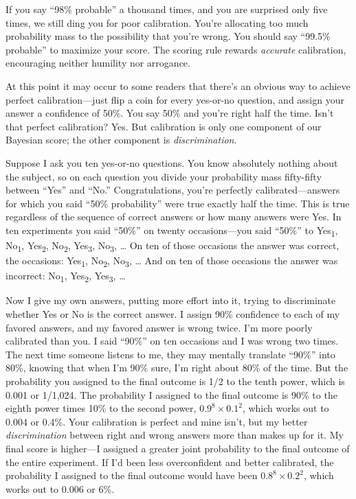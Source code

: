 {
 If you say ``98\% probable'' a
thousand times, and you are surprised only five times, we still ding
you for poor calibration. You're allocating too much
probability mass to the possibility that you're wrong.
You should say ``99.5\% probable''
to maximize your score. The scoring rule rewards \textit{accurate}
calibration, encouraging neither humility nor arrogance.}

{
 At this point it may occur to some readers that
there's an obvious way to achieve perfect
calibration---just flip a coin for every yes-or-no question, and assign
your answer a confidence of 50\%. You say 50\% and
you're right half the time. Isn't that
perfect calibration? Yes. But calibration is only one component of our
Bayesian score; the other component is \textit{discrimination}.}

{
 Suppose I ask you ten yes-or-no questions. You know absolutely
nothing about the subject, so on each question you divide your
probability mass fifty-fifty between
``Yes'' and
``No.'' Congratulations,
you're perfectly calibrated---answers for which you
said ``50\% probability'' were true
exactly half the time. This is true regardless of the sequence of
correct answers or how many answers were Yes. In ten experiments you
said ``50\%'' on twenty
occasions---you said ``50\%'' to
Yes\textsubscript{1}, No\textsubscript{1}, Yes\textsubscript{2},
No\textsubscript{2}, Yes\textsubscript{3}, No\textsubscript{3}, \ldots
On ten of those occasions the answer was correct, the occasions:
Yes\textsubscript{1}, No\textsubscript{2}, No\textsubscript{3}, \ldots
And on ten of those occasions the answer was incorrect:
No\textsubscript{1}, Yes\textsubscript{2}, Yes\textsubscript{3}, \ldots}

{
 Now I give my own answers, putting more effort into it, trying to
discriminate whether Yes or No is the correct answer. I assign 90\%
confidence to each of my favored answers, and my favored answer is
wrong twice. I'm more poorly calibrated than you. I
said ``90\%'' on ten occasions and I
was wrong two times. The next time someone listens to me, they may
mentally translate ``90\%'' into
80\%, knowing that when I'm 90\% sure,
I'm right about 80\% of the time. But the probability
you assigned to the final outcome is 1/2 to the tenth power, which is
0.001 or 1/1,024. The probability I assigned to the final outcome is
90\% to the eighth power times 10\% to the second power,
$0.9^8 \times 0.1^2$, which works
out to 0.004 or 0.4\%. Your calibration is perfect and mine
isn't, but my better \textit{discrimination} between
right and wrong answers more than makes up for it. My final score is
higher---I assigned a greater joint probability to the final outcome of
the entire experiment. If I'd been less overconfident
and better calibrated, the probability I assigned to the final outcome
would have been $0.8^8 \times 0.2^2$, which works out to 0.006 or 6\%.}

